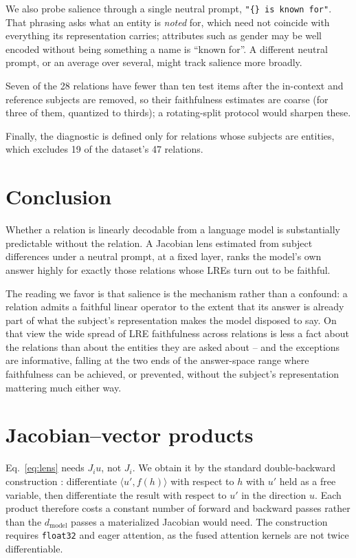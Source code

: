 \documentclass[11pt]{article}
\begin{document}
We also probe salience through a single neutral prompt,
\texttt{"\{\} is known for"}. That phrasing asks what an entity is
\emph{noted} for, which need not coincide with everything its
representation carries; attributes such as gender may be well encoded
without being something a name is ``known for''. A different neutral
prompt, or an average over several, might track salience more broadly.

Seven of the 28 relations have fewer than ten test items after the
in-context and reference subjects are removed, so their faithfulness
estimates are coarse (for three of them, quantized to thirds); a
rotating-split protocol would sharpen these.

Finally, the diagnostic is
defined only for relations whose subjects are entities, which excludes 19
of the dataset's 47 relations.

\section{Conclusion}

Whether a relation is linearly decodable from a language model is
substantially predictable without the relation. A Jacobian lens estimated
from subject differences under a neutral prompt, at a fixed layer, ranks
the model's own answer highly for exactly those relations whose LREs turn
out to be faithful.

The reading we favor is that salience is the mechanism rather than a
confound: a relation admits a faithful linear operator to the extent that
its answer is already part of what the subject's representation makes the
model disposed to say. On that view the wide spread of LRE faithfulness
across relations is less a fact about the relations than about the
entities they are asked about -- and the exceptions are informative,
falling at the two ends of the answer-space range where faithfulness can
be achieved, or prevented, without the subject's representation mattering
much either way.



\appendix

\section{Jacobian--vector products}
\label{sec:jvp}

Eq.~\ref{eq:lens} needs $J_i u$, not $J_i$. We obtain it by the standard
double-backward construction \citep{pearlmutter1994fast}: differentiate
$\langle u', f(h)\rangle$ with respect to $h$ with $u'$ held as a free
variable, then differentiate the result with respect to $u'$ in the
direction $u$. Each product therefore costs a constant number of forward
and backward passes rather than the $d_{\text{model}}$ passes a
materialized Jacobian would need. The construction requires
\texttt{float32} and eager attention, as the fused attention kernels are
not twice differentiable.
\end{document}
